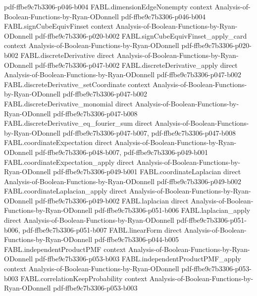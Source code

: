 \begin{theorem}
  {pdf-ffbe9c7b3306-p046-b004}
\proofstep
  {FABL.dimensionEdgeNonempty}
  {context}
  {Analysis-of-Boolean-Functions-by-Ryan-ODonnell}
  {pdf-ffbe9c7b3306-p046-b004}
\proofstep
  {FABL.signCubeEquivFinset}
  {context}
  {Analysis-of-Boolean-Functions-by-Ryan-ODonnell}
  {pdf-ffbe9c7b3306-p020-b002}
\proofstep
  {FABL.signCubeEquivFinset_apply_card}
  {context}
  {Analysis-of-Boolean-Functions-by-Ryan-ODonnell}
  {pdf-ffbe9c7b3306-p020-b002}
\proofstep
  {FABL.discreteDerivative}
  {direct}
  {Analysis-of-Boolean-Functions-by-Ryan-ODonnell}
  {pdf-ffbe9c7b3306-p047-b002}
\proofstep
  {FABL.discreteDerivative_apply}
  {direct}
  {Analysis-of-Boolean-Functions-by-Ryan-ODonnell}
  {pdf-ffbe9c7b3306-p047-b002}
\proofstep
  {FABL.discreteDerivative_setCoordinate}
  {context}
  {Analysis-of-Boolean-Functions-by-Ryan-ODonnell}
  {pdf-ffbe9c7b3306-p047-b002}
\proofstep
  {FABL.discreteDerivative_monomial}
  {direct}
  {Analysis-of-Boolean-Functions-by-Ryan-ODonnell}
  {pdf-ffbe9c7b3306-p047-b008}
\proofstep
  {FABL.discreteDerivative_eq_fourier_sum}
  {direct}
  {Analysis-of-Boolean-Functions-by-Ryan-ODonnell}
  {pdf-ffbe9c7b3306-p047-b007,
    pdf-ffbe9c7b3306-p047-b008}
\proofstep
  {FABL.coordinateExpectation}
  {direct}
  {Analysis-of-Boolean-Functions-by-Ryan-ODonnell}
  {pdf-ffbe9c7b3306-p048-b007,
    pdf-ffbe9c7b3306-p049-b001}
\proofstep
  {FABL.coordinateExpectation_apply}
  {direct}
  {Analysis-of-Boolean-Functions-by-Ryan-ODonnell}
  {pdf-ffbe9c7b3306-p049-b001}
\proofstep
  {FABL.coordinateLaplacian}
  {direct}
  {Analysis-of-Boolean-Functions-by-Ryan-ODonnell}
  {pdf-ffbe9c7b3306-p049-b002}
\proofstep
  {FABL.coordinateLaplacian_apply}
  {direct}
  {Analysis-of-Boolean-Functions-by-Ryan-ODonnell}
  {pdf-ffbe9c7b3306-p049-b002}
\proofstep
  {FABL.laplacian}
  {direct}
  {Analysis-of-Boolean-Functions-by-Ryan-ODonnell}
  {pdf-ffbe9c7b3306-p051-b006}
\proofstep
  {FABL.laplacian_apply}
  {direct}
  {Analysis-of-Boolean-Functions-by-Ryan-ODonnell}
  {pdf-ffbe9c7b3306-p051-b006,
    pdf-ffbe9c7b3306-p051-b007}
\proofstep
  {FABL.linearForm}
  {direct}
  {Analysis-of-Boolean-Functions-by-Ryan-ODonnell}
  {pdf-ffbe9c7b3306-p044-b005}
\proofstep
  {FABL.independentProductPMF}
  {context}
  {Analysis-of-Boolean-Functions-by-Ryan-ODonnell}
  {pdf-ffbe9c7b3306-p053-b003}
\proofstep
  {FABL.independentProductPMF_apply}
  {context}
  {Analysis-of-Boolean-Functions-by-Ryan-ODonnell}
  {pdf-ffbe9c7b3306-p053-b003}
\proofstep
  {FABL.correlationKeepProbability}
  {context}
  {Analysis-of-Boolean-Functions-by-Ryan-ODonnell}
  {pdf-ffbe9c7b3306-p053-b003}
\proofstep

\end{theorem}
